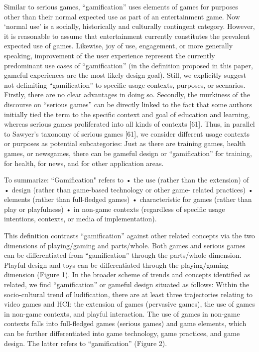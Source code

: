 Similar to serious games, “gamification” uses elements of games for purposes other than their normal expected use as part of an entertainment game. Now ‘normal use’ is a socially, historically and culturally contingent category. However, it is reasonable to assume that entertainment currently constitutes the prevalent expected use of games. Likewise, joy of use, engagement, or more generally speaking, improvement of the user experience represent the currently predominant use cases of “gamification” (in the definition proposed in this paper, gameful experiences are the most likely design goal). Still, we explicitly suggest not delimiting “gamification” to specific usage contexts, purposes, or scenarios. Firstly, there are no clear advantages in doing so. Secondly, the murkiness of the discourse on “serious games” can be directly linked to the fact that some authors initially tied the term to the specific context and goal of education and learning, whereas serious games proliferated into all kinds of contexts [61]. Thus, in parallel to Sawyer’s taxonomy of serious games [61], we consider different usage contexts or purposes as potential subcategories: Just as there are training games, health games, or newsgames, there can be gameful design or “gamification” for training, for health, for news, and for other application areas.

To summarize: ``Gamification" refers to
• the use (rather than the extension) of
• design (rather than game-based technology or other game-
related practices)
• elements (rather than full-fledged games)
• characteristic for games (rather than play or playfulness)
• in non-game contexts (regardless of specific usage intentions, contexts, or media of implementation).

This definition contrasts “gamification” against other related concepts via the two dimensions of playing/gaming and parts/whole. Both games and serious games can be differentiated from “gamification” through the parts/whole dimension. Playful design and toys can be differentiated through the playing/gaming dimension (Figure 1). In the broader scheme of trends and concepts identified as related, we find “gamification” or gameful design situated as follows: Within the socio-cultural trend of ludification, there are at least three trajectories relating to video games and HCI: the extension of games (pervasive games), the use of games in non-game contexts, and playful interaction. The use of games in non-game contexts falls into full-fledged games (serious games) and game elements, which can be further differentiated into game technology, game practices, and game design. The latter refers to “gamification” (Figure 2).

